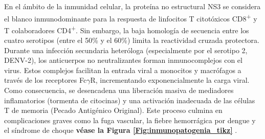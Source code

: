 En el ámbito de la inmunidad celular, la proteína no estructural NS3 se considera el blanco inmunodominante para la respuesta de linfocitos T citotóxicos CD8\textsuperscript{+} y T colaboradores CD4\textsuperscript{+}. Sin embargo, la baja homología de secuencia entre los cuatro serotipos (entre el 50\% y el 60\%) limita la reactividad cruzada protectora. Durante una infección secundaria heteróloga (especialmente por el serotipo 2, DENV-2), los anticuerpos no neutralizantes forman inmunocomplejos con el virus. Estos complejos facilitan la entrada viral a monocitos y macrófagos a través de los receptores Fc$\gamma$R, incrementando exponencialmente la carga viral. Como consecuencia, se desencadena una liberación masiva de mediadores inflamatorios (tormenta de citocinas) y una activación inadecuada de las células T de memoria (Pecado Antigénico Original). Este proceso culmina en complicaciones graves como la fuga vascular, la fiebre hemorrágica por dengue y el síndrome de choque \textbf{véase la Figura \ref{Fig:inmunopatogenia_tikz}} \cite{st2019adaptive}.
